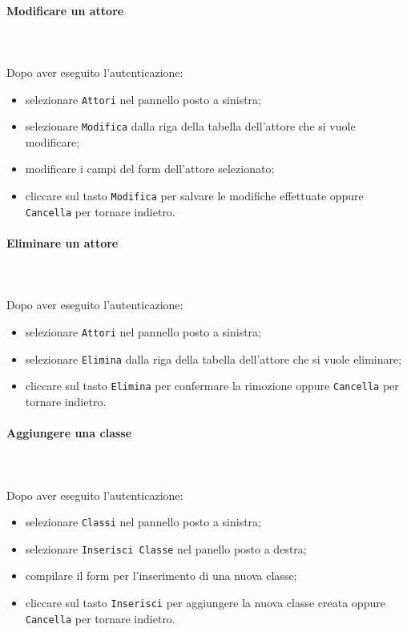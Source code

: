 	\paragraph{Modificare un attore} \mbox{}\\ \mbox{}\\
	Dopo aver eseguito l'autenticazione:
	\begin{itemize}
		\item selezionare \texttt{Attori} nel pannello posto a sinistra;
		\item selezionare \texttt{Modifica} dalla riga della tabella dell'attore
		che si vuole modificare;
		\item modificare i campi del form dell'attore selezionato;
		\item cliccare sul tasto \texttt{Modifica} per salvare le modifiche effettuate
		oppure \texttt{Cancella} per tornare indietro.	
	\end{itemize}
	
	\paragraph{Eliminare un attore} \mbox{}\\ \mbox{}\\
	Dopo aver eseguito l'autenticazione:
	\begin{itemize}
		\item selezionare \texttt{Attori} nel pannello posto a sinistra;
		\item selezionare \texttt{Elimina} dalla riga della tabella dell'attore
		che si vuole eliminare;
		\item cliccare sul tasto \texttt{Elimina} per confermare la rimozione
		oppure \texttt{Cancella} per tornare indietro.	
	\end{itemize}
	
	\paragraph{Aggiungere una classe} \mbox{}\\ \mbox{}\\
	Dopo aver eseguito l'autenticazione:
	\begin{itemize}
		\item selezionare \texttt{Classi} nel pannello posto a sinistra;
		\item selezionare \texttt{Inserisci Classe} nel panello posto a destra;
		\item compilare il form per l'inserimento di una nuova classe;
		\item cliccare sul tasto \texttt{Inserisci} per aggiungere la nuova classe 
		creata oppure \texttt{Cancella} per tornare indietro.	
	\end{itemize}
	
